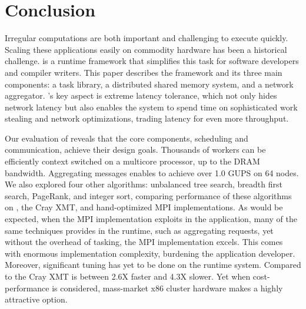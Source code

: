 \section{Conclusion}

Irregular computations are both important and challenging to execute quickly.
Scaling these applications easily on commodity hardware has been a historical
challenge. \Grappa is a runtime framework that simplifies this task for
software developers and compiler writers. This paper describes the \Grappa
framework and its three main components: a task library, a distributed shared
memory system, and a network aggregator. \Grappa's key aspect is extreme latency tolerance,
which not only hides network latency but also enables the system to spend time
on sophisticated work stealing and network optimizations, trading latency for
even more throughput.

Our evaluation of \Grappa reveals that the core components, scheduling and communication, achieve their design goals.  Thousands of workers can be efficiently context switched on a multicore processor, up to the DRAM bandwidth.  Aggregating messages enables \Grappa to achieve over 1.0 GUPS on 64 nodes.  We also explored four other algorithms: unbalanced tree search, breadth first search, PageRank, and integer sort, comparing performance of these algorithms on \Grappa, the Cray XMT, and hand-optimized MPI implementations.  As would be expected, when the MPI implementation exploits in the application, many of the same techniques \Grappa provides in the runtime, such as aggregating requests, yet without the overhead of tasking, the MPI implementation excels.  This comes with enormous implementation complexity, burdening the application developer. Moreover, significant tuning has yet to be done on the \Grappa runtime system.  Compared to the Cray XMT \Grappa is between 2.6X faster and 4.3X slower.  Yet when cost-performance is considered, mass-market x86 cluster hardware makes \Grappa a highly attractive option. 
